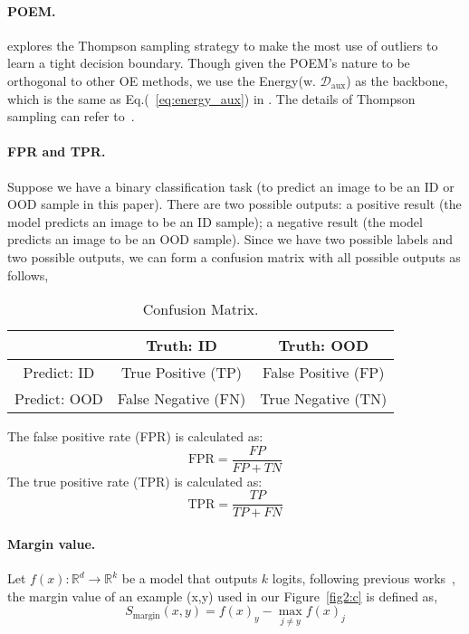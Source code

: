 \documentclass{article}
\theoremstyle{plain}
\theoremstyle{definition}
\theoremstyle{remark}
\begin{document}
\paragraph{POEM.} \citep{ming2022poem} explores the Thompson sampling strategy \citep{thompson} to make the most use of outliers to learn a tight decision boundary. Though given the POEM's nature to be orthogonal to other OE methods, we use the Energy(w. $\mathcal{D}_{\text{aux}}$) as the backbone, which is the same as Eq.(~\ref{eq:energy_aux}) in \citet{liu2020energy}. The details of Thompson sampling can refer to~\citet{ming2022poem}.

\paragraph{FPR and TPR.} Suppose we have a binary classification task (to predict an image to be an ID or OOD sample in this paper). There are two possible outputs: a positive result (the model predicts an image to be an ID sample); a negative result (the model predicts an image to be an OOD sample). Since we have two possible labels and two possible outputs, we can form a confusion matrix with all possible outputs as follows,

\begin{table}[h!]
    \caption{Confusion Matrix.}
    \vspace{3mm}
    \centering
    \footnotesize
    \begin{tabular}{c|c|c}
         \toprule[0.6pt]
         & Truth: ID & Truth: OOD\\
        \midrule[0.6pt]
         Predict: ID & True Positive (TP) & False Positive (FP)\\
        \midrule[0.6pt]
         Predict: OOD & False Negative (FN) & True Negative (TN)\\
         \bottomrule[0.6pt]
    \end{tabular}
    \label{tab:confusion}
\end{table}


The false positive rate (FPR) is calculated as:
\begin{equation}
\label{eq:fpr}
    \text{FPR} = \frac{FP}{FP +TN}
\end{equation}
The true positive rate (TPR) is calculated as:
\begin{equation}
\label{eq:tpr}
    \text{TPR} = \frac{TP}{TP + FN}
\end{equation}

\paragraph{Margin value.} Let $f(x): \mathbb{R}^d \rightarrow \mathbb{R}^k$ be a model that outputs $k$ logits, following previous works~\citep{koltchinskii2002empirical,cao2019learning}, the margin value of an example (x,y) used in our Figure~\ref{fig2:c} is defined as,
\begin{equation}
\label{eq:margin}
    S_\text{margin}(x,y) = f(x)_y-\max_{j\neq y}f(x)_j
\end{equation}
\end{document}
